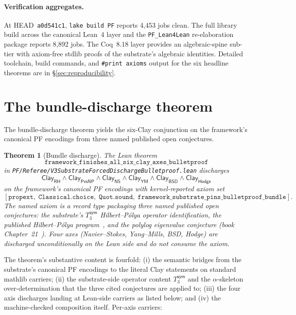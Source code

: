 \documentclass[11pt,a4paper]{amsart}
\theoremstyle{plain}
\newtheorem{theorem}{Theorem}[section]
\theoremstyle{definition}
\begin{document}
\paragraph{Verification aggregates.} At HEAD~\texttt{a0d541c1}, \texttt{lake build PF} reports 4{,}453 jobs clean. The full library build across the canonical Lean~4 layer and the \texttt{PF\_Lean4Lean} re-elaboration package reports 8{,}892 jobs. The Coq~8.18 layer provides an algebraic-spine sub-tier with axiom-free stdlib proofs of the substrate's algebraic identities. Detailed toolchain, build commands, and \texttt{\#print axioms} output for the six headline theorems are in \S\ref{sec:reproducibility}.

\section{The bundle-discharge theorem}\label{sec:bundle}

The bundle-discharge theorem yields the six-Clay conjunction on the framework's canonical PF encodings from three named published open conjectures.

\begin{theorem}[Bundle discharge]\label{thm:bundle}
The Lean theorem
\[
\texttt{framework\_finishes\_all\_six\_clay\_axes\_bulletproof}
\]
in \texttt{PF/Referee/V3SubstrateForcedDischargeBulletproof.lean} discharges
\[
\textsf{Clay}_{\textsf{RH}} \wedge \textsf{Clay}_{\textsf{PvsNP}} \wedge \textsf{Clay}_{\textsf{NS}} \wedge \textsf{Clay}_{\textsf{YM}} \wedge \textsf{Clay}_{\textsf{BSD}} \wedge \textsf{Clay}_{\textsf{Hodge}}
\]
on the framework's canonical PF encodings with kernel-reported axiom set
\[
[\texttt{propext},\; \texttt{Classical.choice},\; \texttt{Quot.sound},\; \texttt{framework\_substrate\_pins\_bulletproof\_bundle}].
\]
The named axiom is a record type packaging three named published open conjectures: the substrate's $T_3^{\textsf{sym}}$ Hilbert--P\'olya operator identification, the published Hilbert--P\'olya program~\cite{mayer1991,berry-keating1999,connes1999}, and the polylog eigenvalue conjecture (book Chapter~21~\cite{cohen2026book}). Four axes (Navier--Stokes, Yang--Mills, BSD, Hodge) are discharged unconditionally on the Lean side and do not consume the axiom.
\end{theorem}

The theorem's substantive content is fourfold: (i) the semantic bridges from the substrate's canonical PF encodings to the literal Clay statements on standard mathlib carriers; (ii) the substrate-side operator content $T_3^{\textsf{sym}}$ and the $\alpha$-skeleton over-determination that the three cited conjectures are applied to; (iii) the four axis discharges landing at Lean-side carriers as listed below; and (iv) the machine-checked composition itself. Per-axis carriers:
\end{document}
